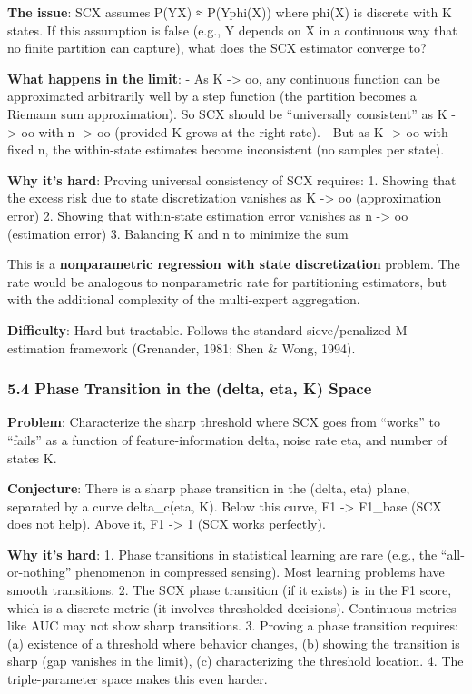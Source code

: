 \documentclass[
  12pt,
]{article}
\begin{document}
\textbf{The issue}: SCX assumes P(Y\textbar X) ≈ P(Y\textbar phi(X))
where phi(X) is discrete with K states. If this assumption is false
(e.g., Y depends on X in a continuous way that no finite partition can
capture), what does the SCX estimator converge to?

\textbf{What happens in the limit}: - As K -\textgreater{} oo, any
continuous function can be approximated arbitrarily well by a step
function (the partition becomes a Riemann sum approximation). So SCX
should be ``universally consistent'' as K -\textgreater{} oo with n
-\textgreater{} oo (provided K grows at the right rate). - But as K
-\textgreater{} oo with fixed n, the within-state estimates become
inconsistent (no samples per state).

\textbf{Why it's hard}: Proving universal consistency of SCX requires:
1. Showing that the excess risk due to state discretization vanishes as
K -\textgreater{} oo (approximation error) 2. Showing that within-state
estimation error vanishes as n -\textgreater{} oo (estimation error) 3.
Balancing K and n to minimize the sum

This is a \textbf{nonparametric regression with state discretization}
problem. The rate would be analogous to nonparametric rate for
partitioning estimators, but with the additional complexity of the
multi-expert aggregation.

\textbf{Difficulty}: Hard but tractable. Follows the standard
sieve/penalized M-estimation framework (Grenander, 1981; Shen \& Wong,
1994).

\subsubsection{5.4 Phase Transition in the (delta, eta, K)
Space}\label{phase-transition-in-the-delta-eta-k-space}

\textbf{Problem}: Characterize the sharp threshold where SCX goes from
``works'' to ``fails'' as a function of feature-information delta, noise
rate eta, and number of states K.

\textbf{Conjecture}: There is a sharp phase transition in the (delta,
eta) plane, separated by a curve delta\_c(eta, K). Below this curve, F1
-\textgreater{} F1\_base (SCX does not help). Above it, F1
-\textgreater{} 1 (SCX works perfectly).

\textbf{Why it's hard}: 1. Phase transitions in statistical learning are
rare (e.g., the ``all-or-nothing'' phenomenon in compressed sensing).
Most learning problems have smooth transitions. 2. The SCX phase
transition (if it exists) is in the F1 score, which is a discrete metric
(it involves thresholded decisions). Continuous metrics like AUC may not
show sharp transitions. 3. Proving a phase transition requires: (a)
existence of a threshold where behavior changes, (b) showing the
transition is sharp (gap vanishes in the limit), (c) characterizing the
threshold location. 4. The triple-parameter space makes this even
harder.
\end{document}
